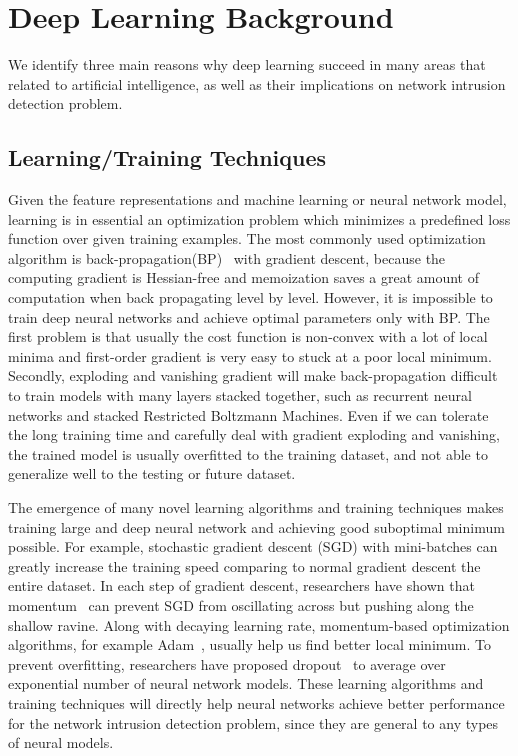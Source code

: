 \section{Deep Learning Background}
We identify three main reasons why deep learning succeed in many areas that related
to artificial intelligence, as well as their implications on network intrusion detection problem.

\subsection{Learning/Training Techniques}
Given the feature representations and machine learning or neural network model,
learning is in essential an optimization problem which minimizes a predefined loss function over given training examples.
The most commonly used optimization algorithm is back-propagation(BP)~\cite{Backpropagation} with gradient descent,
because the computing gradient is Hessian-free and memoization saves a great amount of computation when
back propagating level by level.
However, it is impossible to train deep neural networks and achieve optimal parameters only with BP.
The first problem is that usually the cost function is non-convex with a lot of local minima and
first-order gradient is very easy to stuck at a poor local minimum.
Secondly, exploding and vanishing gradient will make back-propagation difficult to train models with many layers stacked together,
such as recurrent neural networks and stacked Restricted Boltzmann Machines.
Even if we can tolerate the long training time and carefully deal with gradient exploding and vanishing,
the trained model is usually overfitted to the training dataset, and not able to generalize well to the testing or future dataset.

The emergence of many novel learning algorithms and training techniques makes training large and deep
neural network and achieving good suboptimal minimum possible.
For example, stochastic gradient descent (SGD) with mini-batches can greatly increase the training speed comparing
to normal gradient descent the entire dataset.
In each step of gradient descent, researchers have shown that momentum~\cite{Momentum} can
prevent SGD from oscillating across but pushing along the shallow ravine.
Along with decaying learning rate, momentum-based optimization algorithms, for example Adam~\cite{Adam},
usually help us find better local minimum.
To prevent overfitting, researchers have proposed dropout~\cite{Dropout} to average over
exponential number of neural network models.
These learning algorithms and training techniques will directly help neural networks achieve
better performance for the network intrusion detection problem,
since they are general to any types of neural models.


